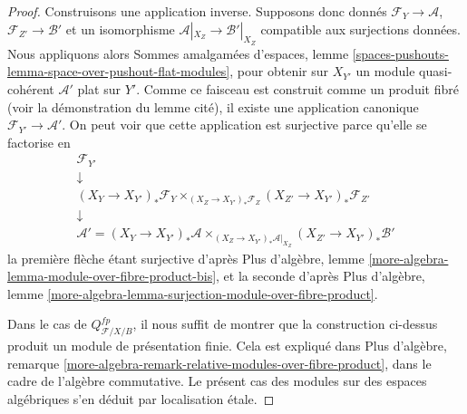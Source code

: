 \begin{proof}
Construisons une application inverse. Supposons donc donnés
$\mathcal{F}_Y \to \mathcal{A}$,
$\mathcal{F}_{Z'} \to \mathcal{B}'$ et un isomorphisme
$\mathcal{A}|_{X_Z} \to \mathcal{B}'|_{X_Z}$ compatible aux surjections
données. Nous appliquons alors Sommes amalgamées d'espaces, lemme
\ref{spaces-pushouts-lemma-space-over-pushout-flat-modules}, pour obtenir sur
$X_{Y'}$ un module quasi-cohérent $\mathcal{A}'$ plat sur $Y'$. Comme ce
faisceau est construit comme un produit fibré (voir la démonstration du lemme
cité), il existe une application canonique
$\mathcal{F}_{Y'} \to \mathcal{A}'$. On peut voir que cette application est
surjective parce qu'elle se factorise en
$$
\begin{matrix}
\mathcal{F}_{Y'} \\
\downarrow \\
(X_Y \to X_{Y'})_*\mathcal{F}_Y
\times_{(X_Z \to X_{Y'})_*\mathcal{F}_Z}
(X_{Z'} \to X_{Y'})_*\mathcal{F}_{Z'} \\
\downarrow \\
\mathcal{A}' =
(X_Y \to X_{Y'})_*\mathcal{A}
\times_{(X_Z \to X_{Y'})_*\mathcal{A}|_{X_Z}}
(X_{Z'} \to X_{Y'})_*\mathcal{B}'
\end{matrix}
$$
la première flèche étant surjective d'après Plus d'algèbre, lemme
\ref{more-algebra-lemma-module-over-fibre-product-bis}, et la seconde d'après
Plus d'algèbre, lemme
\ref{more-algebra-lemma-surjection-module-over-fibre-product}.

\medskip\noindent
Dans le cas de $Q^{fp}_{\mathcal{F}/X/B}$, il nous suffit de montrer que la
construction ci-dessus produit un module de présentation finie. Cela est
expliqué dans Plus d'algèbre, remarque
\ref{more-algebra-remark-relative-modules-over-fibre-product}, dans le cadre de
l'algèbre commutative. Le présent cas des modules sur des espaces algébriques
s'en déduit par localisation \'etale.
\end{proof}

